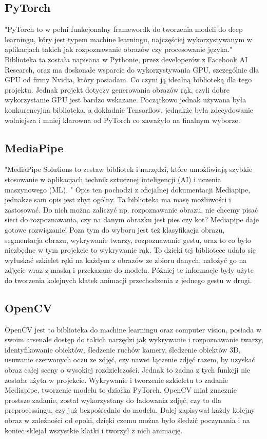 \documentclass[12pt]{article}
\begin{document}
\begin{sloppypar}
{  \subsection{PyTorch}
  {
    "PyTorch to w pełni funkcjonalny framewordk do tworzenia modeli do deep learningu, kóry jest typem machine learningu, najczęściej wykorzystywanym w aplikacjach takich jak
    rozpoznawanie obrazów czy procesowanie języka."\cite{pytorch-nvidia} 
    Biblioteka ta została napisana w Pythonie, przez developerów z Facebook AI Research, oraz ma doskonałe wsparcie do wykorzystywania GPU, szczególnie dla GPU od firmy Nvidia, który posiadam.
    Co czyni ją idealną biblioteką dla tego projektu. Jednak projekt dotyczy generowania obrazów rąk, czyli dobre wykorzystanie GPU jest bardzo wskazane.
    Początkowo jednak używana była konkurencyjna biblioteka, a dokładnie Tensorflow, jednakże była zdecydowanie wolniejsza i mniej klarowna od PyTorch co zaważyło na finalnym wyborze.
  }
  \subsection{MediaPipe}
  {
    "MediaPipe Solutions to zestaw bibliotek i narzędzi, które umożliwiają szybkie stosowanie w aplikacjach technik sztucznej inteligencji (AI) i uczenia maszynowego (ML). "\cite{mediapipe}
    Opis ten pochodzi z oficjalnej dokumentacji Mediapipe, jednakże sam opis jest zbyt ogólny. 
    Ta biblioteka ma masę możliiwości i zastosować. Do nich można zaliczyć np. rozpoznawanie obrazu, nie chcemy pisać sieci do rozpoznawania, czy na danym obrazku jest pies czy kot? Mediapipe daje gotowe rozwiązanie!
    Poza tym do wyboru jest też klasyfikacja obrazu, segmentacja obrazu, wykrywanie twarzy, rozpoznawanie gestu, oraz to co było niezbędne w tym projekcie to wykrywanie rąk.
    To dzieki tej bibliotece udało się wyłuskać szkielet ręki na każdym z obrazów ze zbioru danych, nałożyć go na zdjęcie wraz z maską i przekazane do modelu. 
    Później te informacje były użyte do tworzenia kolejnych klatek animacji przechodzenia z jednego gestu w drugi.
  }
  \subsection{OpenCV}
  {
    OpenCV jest to biblioteka do machine learningu oraz computer vision, posiada w swoim arsenale dostęp do takich narzędzi jak wykrywanie i rozpoznawanie twarzy,
    identyfikowanie obiektów, śledzenie ruchów kamery, śledzenie obiektów 3D, usuwanie czerwonych oczu ze zdjęć, czy nawet łączenie zdjęć razem, by uzyskać obraz całej sceny o wysokiej rozdzielczości.\cite{opencv}
    Jednak to żadna z tych funkcji nie została użyta w projekcie. 
    Wykrywanie i tworzenie szkieletu to zadanie Mediapipe, tworzenie modelu to działka PyTorch. 
    OpenCV miał znacznie prostsze zadanie, został wykorzystany do ładowania zdjęć, czy to dla preprocessingu, czy już bezpośrednio do modelu.
    Dalej zapisywał każdy kolejny obraz w zależności od epoki, dzięki czemu można było śledzić poczynania i na koniec sklejał wszystkie klatki i tworzył z nich animację.
  }
}


\end{sloppypar}
\end{document}
